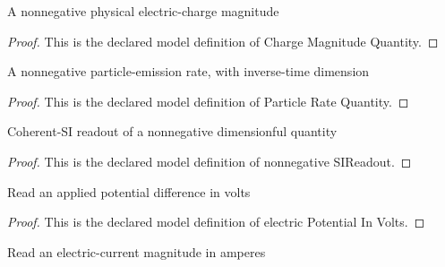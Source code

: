 \begin{definition}
  \label{def:physics:phyx-mini-0642:phyxminiproblems-problemphyxmini0642-chargemagnitudequantity}
  A nonnegative physical electric-charge magnitude
\end{definition}
\begin{proof}
  This is the declared model definition of Charge Magnitude Quantity.
\end{proof}
\begin{definition}
  \label{def:physics:phyx-mini-0642:phyxminiproblems-problemphyxmini0642-particleratequantity}
  A nonnegative particle-emission rate, with inverse-time dimension
\end{definition}
\begin{proof}
  This is the declared model definition of Particle Rate Quantity.
\end{proof}
\begin{definition}
  \label{def:physics:phyx-mini-0642:phyxminiproblems-problemphyxmini0642-nonnegativesireadout}
  Coherent-SI readout of a nonnegative dimensionful quantity
\end{definition}
\begin{proof}
  This is the declared model definition of nonnegative SIReadout.
\end{proof}
\begin{definition}
  \label{def:physics:phyx-mini-0642:phyxminiproblems-problemphyxmini0642-electricpotentialinvolts}
  Read an applied potential difference in volts
\end{definition}
\begin{proof}
  This is the declared model definition of electric Potential In Volts.
\end{proof}
\begin{definition}
  \label{def:physics:phyx-mini-0642:phyxminiproblems-problemphyxmini0642-electriccurrentinamperes}
  Read an electric-current magnitude in amperes
\end{definition}
